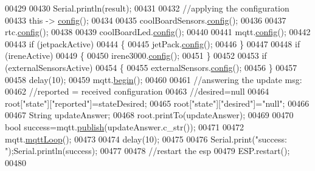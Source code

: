 \begin{DoxyCode}
00429 
00430             Serial.println(result);
00431 
00432             \textcolor{comment}{//applying the configuration    }
00433             \textcolor{keyword}{this} -> \hyperlink{class_cool_board_a583a874c09c07e70a6eb9229fc4beddb}{config}();
00434 
00435             coolBoardSensors.\hyperlink{class_cool_board_sensors_a9a218895c5423375c33c08f2c56fb23a}{config}();
00436 
00437             rtc.\hyperlink{class_cool_time_a87c28260c1bc77091162cbcf1ee2e129}{config}();
00438 
00439             coolBoardLed.\hyperlink{class_cool_board_led_a1b60e5e30bea96c49ed62ed1bf1ffc8b}{config}();
00440 
00441             mqtt.\hyperlink{class_cool_m_q_t_t_a9b703de4f1358f0ee7a5e8c44979c648}{config}();
00442 
00443             \textcolor{keywordflow}{if} (jetpackActive)
00444             \{
00445                 jetPack.\hyperlink{class_jetpack_ab065ee83e244265a2223a22f3ee4a719}{config}();
00446             \}
00447 
00448             \textcolor{keywordflow}{if} (ireneActive)
00449             \{
00450                 irene3000.\hyperlink{class_irene3000_afed5c35e4b23963c157847ef27c11e9c}{config}();
00451             \}
00452 
00453             \textcolor{keywordflow}{if} (externalSensorsActive)
00454             \{
00455                 externalSensors.\hyperlink{class_external_sensors_a862a4bd11346b37270d0244c2adabe5a}{config}();
00456             \}
00457 
00458             delay(10);
00459             mqtt.\hyperlink{class_cool_m_q_t_t_ac9248808641ebf3054ed0620ea9d0100}{begin}();
00460 
00461                 \textcolor{comment}{//answering the update msg:}
00462             \textcolor{comment}{//reported = received configuration}
00463             \textcolor{comment}{//desired=null}
00464             root[\textcolor{stringliteral}{"state"}][\textcolor{stringliteral}{"reported"}]=stateDesired;
00465             root[\textcolor{stringliteral}{"state"}][\textcolor{stringliteral}{"desired"}]=\textcolor{stringliteral}{"null"};
00466             
00467             String updateAnswer;
00468             root.printTo(updateAnswer);
00469 
00470             \textcolor{keywordtype}{bool} success=mqtt.\hyperlink{class_cool_m_q_t_t_ace977b3e90ab14b1199fe5c4fb0a13ec}{publish}(updateAnswer.c\_str());
00471             
00472             mqtt.\hyperlink{class_cool_m_q_t_t_aa5eaae967b562b62cbcf2b8d81f6e5d5}{mqttLoop}();
00473 
00474             delay(10);
00475 
00476             Serial.print(\textcolor{stringliteral}{"success: "});Serial.println(success);
00477             
00478             \textcolor{comment}{//restart the esp}
00479             ESP.restart();
00480                 

\end{DoxyCode}
